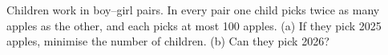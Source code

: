 Children work in boy--girl pairs. In every pair one child picks twice as many apples as the other, and each picks at most 100 apples. (a) If they pick 2025 apples, minimise the number of children. (b) Can they pick 2026?
